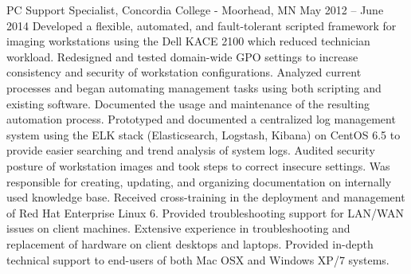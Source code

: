 PC Support Specialist, Concordia College - Moorhead, MN
May 2012 – June 2014
Developed a flexible, automated, and fault-tolerant scripted framework for imaging workstations using the Dell KACE 2100 which reduced technician workload.
Redesigned and tested domain-wide GPO settings to increase consistency and security of workstation configurations.
Analyzed current processes and began automating management tasks using both scripting and existing software. Documented the usage and maintenance of the resulting automation process.
Prototyped and documented a centralized log management system using the ELK stack (Elasticsearch, Logstash, Kibana) on CentOS 6.5 to provide easier searching and trend analysis of system logs.
Audited security posture of workstation images and took steps to correct insecure settings.
Was responsible for creating, updating, and organizing documentation on internally used knowledge base.
Received cross-training in the deployment and management of Red Hat Enterprise Linux 6.
Provided troubleshooting support for LAN/WAN issues on client machines.
Extensive experience in troubleshooting and replacement of hardware on client desktops and laptops.
Provided in-depth technical support to end-users of both Mac OSX and Windows XP/7 systems.
